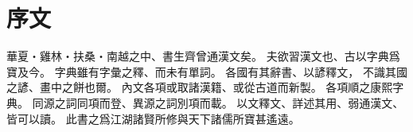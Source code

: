 \chapter*{序文}
華夏・雞林・扶桑・南越之中、書生齊曾通漢文矣。
夫欲習漢文也、古以字典爲寶及今。
字典雖有字彙之釋、而未有單詞。
各國有其辭書、以諺釋文，
不識其國之諺、畫中之餅也爾。
內文各項或取諸漢籍、或從古道而新製。
各項順之康熙字典。
同源之詞同項而登、異源之詞別項而載。
以文釋文、詳述其用、弱通漢文、皆可以讀。
此書之爲江湖諸賢所修與天下諸儒所寶甚遙遠。
